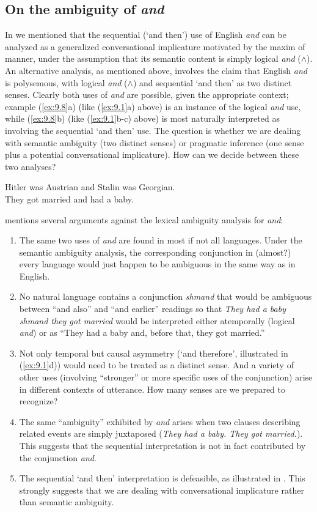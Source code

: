 \subsection{On the ambiguity of \textit{and}}\label{sec:9.2.1} 

In  we mentioned that the sequential (‘and then’) use of English \textit{and} can be analyzed as a generalized conversational implicature motivated by the maxim of manner, under the assumption that its semantic content is simply logical \textit{and} ($\wedge$). An alternative analysis, as mentioned above, involves the claim that English \textit{and} is polysemous, with logical \textit{and} ($\wedge$) and sequential ‘and then’ as two distinct senses. Clearly both uses of \textit{and} are possible, given the appropriate context; example (\ref{ex:9.8}a) (like (\ref{ex:9.1}a) above) is an instance of the logical \textit{and} use, while (\ref{ex:9.8}b) (like (\ref{ex:9.1}b-c) above) is most naturally interpreted as involving the sequential ‘and then’ use. The question is whether we are dealing with semantic ambiguity (two distinct senses) or pragmatic inference (one sense plus a potential conversational implicature). How can we decide between these two analyses?


\ea \label{ex:9.8}
\ea Hitler was Austrian and Stalin was Georgian.\\
\ex They got married and had a baby.
                       \z
\z


\citet{Horn2004} mentions several arguments against the lexical ambiguity analysis for \textit{and}:


\begin{enumerate}[label=\roman*.]
\item The same two uses of \textit{and} are found in most if not all languages. Under the semantic ambiguity analysis, the corresponding conjunction in (almost?) every language would just happen to be ambiguous in the same way as in English.
\item No natural language contains a conjunction \textit{shmand} that would be ambiguous between “and also” and “and earlier” readings so that \textit{They had a baby shmand they got married} would be interpreted either atemporally (logical \textit{and}) or as “They had a baby and, before that, they got married.”
\item Not only temporal but causal asymmetry (‘and therefore’, illustrated in (\ref{ex:9.1}d)) would need to be treated as a distinct sense. And a variety of other uses (involving “stronger” or more specific uses of the conjunction) arise in different contexts of utterance. How many senses are we prepared to recognize?
\item The same “ambiguity” exhibited by \textit{and} arises when two clauses describing related events are simply juxtaposed (\textit{They had a baby. They got married.}). This suggests that the sequential interpretation is not in fact contributed by the conjunction \textit{and}.
\item The sequential ‘and then’ interpretation is defeasible, as illustrated in . This strongly suggests that we are dealing with conversational implicature rather than semantic ambiguity.
\end{enumerate}

